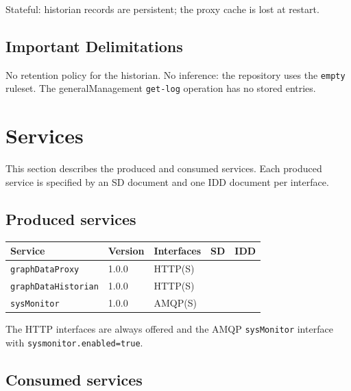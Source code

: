 \documentclass[a4paper]{arrowhead}
\begin{document}
Stateful: historian records are persistent; the proxy cache is lost at restart.

\subsection{Important Delimitations}
\label{sec:delimitations}

No retention policy for the historian. No inference: the repository uses the \texttt{empty} ruleset. The general\allowbreak{}Management \texttt{get-\allowbreak{}log} operation has no stored entries.

\newpage

\section{Services}
\label{sec:services}

This section describes the produced and consumed services. Each produced service is specified by an SD document and one IDD document per interface.

\subsection{Produced services}

\noindent\begin{longtable}{| p{5.3cm} | p{1.3cm} | p{2.6cm} | p{1.6cm} | p{3.6cm} |} \hline
\rowcolor{gray!33} Service & Version & Interfaces & SD & IDD \\ \hline \endhead
\texttt{graphDataProxy} & 1.0.0 & HTTP(S) & \cite{gdm-graphDataProxy-sd} & \cite{gdm-graphDataProxy-http-idd} \\ \hline
\texttt{graphDataHistorian} & 1.0.0 & HTTP(S) & \cite{gdm-graphDataHistorian-sd} & \cite{gdm-graphDataHistorian-http-idd} \\ \hline
\texttt{sysMonitor} & 1.0.0 & AMQP(S) & \cite{gdm-sysMonitor-sd} & \cite{gdm-sysMonitor-amqp-idd} \\ \hline
\end{longtable}

The HTTP interfaces are always offered and the AMQP \texttt{sysMonitor} interface with \texttt{sysmonitor.enabled=true}.

\subsection{Consumed services}
\end{document}
